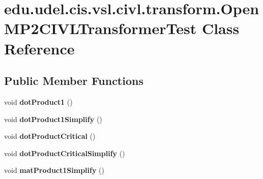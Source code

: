 \hypertarget{classedu_1_1udel_1_1cis_1_1vsl_1_1civl_1_1transform_1_1OpenMP2CIVLTransformerTest}{}\section{edu.\+udel.\+cis.\+vsl.\+civl.\+transform.\+Open\+M\+P2\+C\+I\+V\+L\+Transformer\+Test Class Reference}
\label{classedu_1_1udel_1_1cis_1_1vsl_1_1civl_1_1transform_1_1OpenMP2CIVLTransformerTest}
\subsection*{Public Member Functions}
\begin{DoxyCompactItemize}
\item 
\hypertarget{classedu_1_1udel_1_1cis_1_1vsl_1_1civl_1_1transform_1_1OpenMP2CIVLTransformerTest_afb77e52f3d98847d85211ed67a0ba68c}{}void {\bfseries dot\+Product1} ()\label{classedu_1_1udel_1_1cis_1_1vsl_1_1civl_1_1transform_1_1OpenMP2CIVLTransformerTest_afb77e52f3d98847d85211ed67a0ba68c}

\item 
\hypertarget{classedu_1_1udel_1_1cis_1_1vsl_1_1civl_1_1transform_1_1OpenMP2CIVLTransformerTest_a5ef987a4a52da73705079c0fa272f5c9}{}void {\bfseries dot\+Product1\+Simplify} ()\label{classedu_1_1udel_1_1cis_1_1vsl_1_1civl_1_1transform_1_1OpenMP2CIVLTransformerTest_a5ef987a4a52da73705079c0fa272f5c9}

\item 
\hypertarget{classedu_1_1udel_1_1cis_1_1vsl_1_1civl_1_1transform_1_1OpenMP2CIVLTransformerTest_a7fe047ba4a0134b3d56c55223fa45b0c}{}void {\bfseries dot\+Product\+Critical} ()\label{classedu_1_1udel_1_1cis_1_1vsl_1_1civl_1_1transform_1_1OpenMP2CIVLTransformerTest_a7fe047ba4a0134b3d56c55223fa45b0c}

\item 
\hypertarget{classedu_1_1udel_1_1cis_1_1vsl_1_1civl_1_1transform_1_1OpenMP2CIVLTransformerTest_a4573d807c6ae9f77ea70c6e16c5e8e88}{}void {\bfseries dot\+Product\+Critical\+Simplify} ()\label{classedu_1_1udel_1_1cis_1_1vsl_1_1civl_1_1transform_1_1OpenMP2CIVLTransformerTest_a4573d807c6ae9f77ea70c6e16c5e8e88}

\item 
\hypertarget{classedu_1_1udel_1_1cis_1_1vsl_1_1civl_1_1transform_1_1OpenMP2CIVLTransformerTest_a5b30efccfdfa5bc2e29884e11bf65f43}{}void {\bfseries mat\+Product1\+Simplify} ()\label{classedu_1_1udel_1_1cis_1_1vsl_1_1civl_1_1transform_1_1OpenMP2CIVLTransformerTest_a5b30efccfdfa5bc2e29884e11bf65f43}


\end{DoxyCompactItemize}
